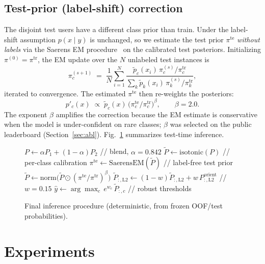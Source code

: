 \documentclass[conference]{IEEEtran}
\begin{document}
\subsection{Test-prior (label-shift) correction}
The disjoint test users have a different class prior than train. Under the label-shift assumption
$p(x\mid y)$ is unchanged, so we estimate the test prior $\pi^{\text{te}}$ \emph{without labels} via the
Saerens EM procedure~\cite{saerens2002adjusting} on the calibrated test posteriors. Initializing
$\pi^{(0)}=\pi^{\text{tr}}$, the EM update over the $N$ unlabeled test instances is
\begin{equation}
\pi^{(s+1)}_c \;=\; \frac{1}{N}\sum_{i=1}^{N}
\frac{\tilde{p}_c(x_i)\,\pi^{(s)}_c/\pi^{\text{tr}}_c}{\sum_{k}\tilde{p}_k(x_i)\,\pi^{(s)}_k/\pi^{\text{tr}}_k},
\label{eq:em}
\end{equation}
iterated to convergence. The estimated $\pi^{\text{te}}$ then re-weights the posteriors:
\begin{equation}
p'_c(x)\;\propto\;\tilde{p}_c(x)\,\big(\pi^{\text{te}}_c/\pi^{\text{tr}}_c\big)^{\beta},\qquad \beta=2.0 .
\label{eq:prior}
\end{equation}
The exponent $\beta$ amplifies the correction because the EM estimate is conservative when the model is
under-confident on rare classes; $\beta$ was selected on the public leaderboard (Section~\ref{sec:abl}).
Fig.~\ref{alg:infer} summarizes test-time inference.

\begin{figure}[t]
\begin{algorithmic}
\STATE $P \leftarrow \alpha P_1 + (1-\alpha)P_2$ \hfill // blend, $\alpha=0.842$
\STATE $\tilde{P} \leftarrow \mathrm{isotonic}(P)$ \hfill // per-class calibration
\STATE $\pi^{\text{te}} \leftarrow \mathrm{SaerensEM}(\tilde{P})$ \hfill // label-free test prior
\STATE $\tilde{P} \leftarrow \mathrm{norm}\big(\tilde{P}\odot(\pi^{\text{te}}/\pi^{\text{tr}})^{\beta}\big)$
\STATE $\tilde{P}_{:,\mathrm{L2}} \leftarrow (1{-}w)\tilde{P}_{:,\mathrm{L2}} + w\,P^{\mathrm{orient}}_{:,\mathrm{L2}}$ \hfill // $w{=}0.15$
\STATE $\hat{y} \leftarrow \arg\max_c\, e^{w_c}\,\tilde{P}_{:,c}$ \hfill // robust thresholds
\end{algorithmic}
\caption{Final inference procedure (deterministic, from frozen OOF/test probabilities).}
\label{alg:infer}
\end{figure}


\section{Experiments}
\label{sec:exp}
\end{document}
